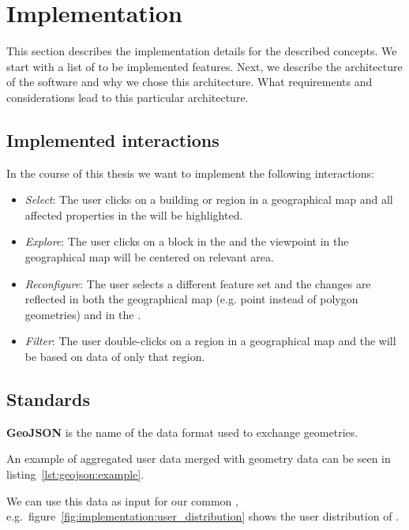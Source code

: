 \chapter{Implementation}\label{sec:implementation}

This section describes the implementation details for the described concepts.
We start with a list of to be implemented features.
Next, we describe the architecture of the software and why we chose this architecture.
What requirements and considerations lead to this particular architecture.


\section{Implemented interactions}

In the course of this thesis we want to implement the following interactions:
\begin{itemize}
  \item
    \emph{Select}: The user clicks on a building or region in a geographical map and all affected properties in the \tmap{} will be highlighted.
  \item
    \emph{Explore}: The user clicks on a block in the \tmap{} and the viewpoint in the geographical map will be centered on relevant area.
  \item
    \emph{Reconfigure}: The user selects a different feature set and the changes are reflected in both the geographical map (e.g. point instead of polygon geometries) and in the \tmap{}.
  \item
    \emph{Filter}: The user double-clicks on a region in a geographical map and the \tmap{} will be based on data of only that region.
\end{itemize}

\section{Standards}

\textbf{GeoJSON} is the name of the data format used to exchange geometries.

An example of aggregated user data merged with geometry data can be seen in listing~\ref{lst:geojson:example}.


We can use this data as input for our common \visan{}, e.g.\ figure~\ref{fig:implementation:user_distribution} shows the user distribution of \rufu{}.

